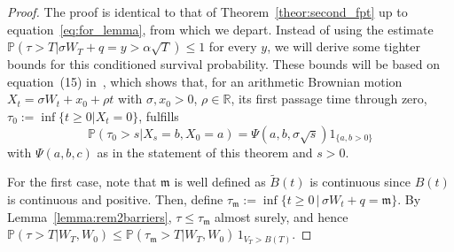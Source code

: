 \documentclass[12pt]{article}
\theoremstyle{definition}
\begin{document}
\begin{proof}

The proof is identical to that of Theorem~\ref{theor:second_fpt} up to equation~\eqref{eq:for_lemma}, from which we depart. Instead of using the estimate $\mathbb{P}(\tau>T\vert \sigma W_T+q=y>\alpha\sqrt{T})\leq 1$ for every $y$, we will derive some tighter bounds for this conditioned survival probability. These bounds will be based on equation~(15) in~\cite{duffie2001term}, which shows that,
for an arithmetic Brownian motion $X_t=\sigma W_t+x_0+\rho t$ with $\sigma, x_0>0$, $\rho \in \mathbb{R}$, its first passage time through zero, $\tau_0:=\inf\lbrace t\geq 0 \vert X_t=0\rbrace$, fulfills
$$
\mathbb{P}\left(\tau_0>s\vert X_s=b, X_0=a\right)=\Psi\!\left(a,b,\sigma\sqrt{s}\right)1_{\lbrace a,b>0\rbrace}
$$
with $\Psi(a,b,c)$ as in the statement of this theorem and $s>0$.

For the first case, note that $\mathfrak{m}$ is well defined as $\tilde{B}(t)$ is continuous since $B(t)$ is continuous and positive. Then, define $\tau_\mathfrak{m} := \inf \{t \ge 0 \, | \, \sigma W_t+q = \mathfrak{m} \}$. By Lemma~\ref{lemma:rem2barriers}, $\tau \le \tau_\mathfrak{m}$ almost surely, and hence $\mathbb{P}(\tau > T\vert W_T,W_0) \le \mathbb{P}(\tau_\mathfrak{m} > T\vert W_T,W_0) \, 1_{V_T>B(T)}$.


\end{proof}
\end{document}
